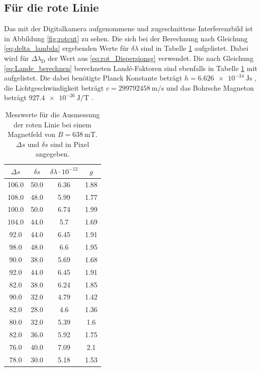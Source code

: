 \subsection{Für die rote Linie}
\label{sec:rot_Lande}
Das mit der Digitalkamera aufgenommene und zugeschnittene Interferenzbild
ist in Abbildung \ref{fig:rotcut} zu sehen.
Die sich bei der Berechnung nach Gleichung \ref{eq:delta_lambda}
ergebenden Werte für $\delta \lambda$ sind in Tabelle \ref{tab:rot_delta_s}
aufgelistet. Dabei wird für $\Delta \lambda_\text{D}$ der Wert aus \ref{eq:rot_Dispersionsg}
verwendet.
Die nach Gleichung \ref{eq:Lande_berechnen} berechneten Landé-Faktoren sind ebenfalls in Tabelle \ref{tab:rot_delta_s}
mit aufgelistet. Die dabei benötigte Planck Konstante beträgt $h =\SI{6.626e-34}{\joule\s}$ \cite{PlanckKonst},
die Lichtgeschwindigkeit beträgt $c=\SI{299792458}{\meter\per\s}$ \cite{Lichtgeschw} und das
Bohrsche Magneton beträgt $\SI{927.4e-26}{\joule\per\tesla}$ \cite{BohrMagneton}.
\begin{table}
  \centering
  \caption{Messwerte für die Ausmessung der roten Linie bei einem Magnetfeld von
  $B = \SI{638}{\milli\tesla}$. $\Delta s$ und $\delta s$ sind in Pixel angegeben.}
  \label{tab:rot_delta_s}
  \begin{tabular}{c | c | c | c}
    \toprule
    $\Delta s$ & $\delta s$ & $\delta \lambda \cdot 10^{-12}$ & $g$\\
    \midrule
    106.0 & 50.0 & 6.36 & 1.88 \\
    108.0 & 48.0 & 5.99 & 1.77 \\
    100.0 & 50.0 & 6.74 & 1.99 \\
    104.0 & 44.0 & 5.7 & 1.69 \\
    92.0 & 44.0 & 6.45 & 1.91 \\
    98.0 & 48.0 & 6.6 & 1.95 \\
    90.0 & 38.0 & 5.69 & 1.68 \\
    92.0 & 44.0 & 6.45 & 1.91 \\
    82.0 & 38.0 & 6.24 & 1.85 \\
    90.0 & 32.0 & 4.79 & 1.42 \\
    82.0 & 28.0 & 4.6 & 1.36 \\
    80.0 & 32.0 & 5.39 & 1.6 \\
    82.0 & 36.0 & 5.92 & 1.75 \\
    76.0 & 40.0 & 7.09 & 2.1 \\
    78.0 & 30.0 & 5.18 & 1.53 \\
    \bottomrule
  \end{tabular}
\end{table}
